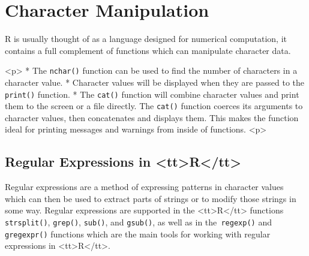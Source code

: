 
\section{Character Manipulation}
R is usually thought of as a language designed for numerical computation,
it contains a full complement of functions which can manipulate character
data.

<p>
*  The \texttt{nchar()} function can be used to find the number of characters in a character value.
*  Character values will be displayed when they are passed to the  \texttt{print()} function.
*  The \texttt{cat()}  function will combine
character values and print them to the screen or a file directly. The \texttt{cat()}
function coerces its arguments to character values, then concatenates and displays
them. This makes the function ideal for printing messages and warnings
from inside of functions.
<p>

\subsection{Regular Expressions in <tt>R</tt>}
Regular expressions are a method of expressing patterns in character values
which can then be used to extract parts of strings or to modify those strings in some way. Regular expressions are supported in the <tt>R</tt> functions \texttt{strsplit()},
\texttt{grep()}, \texttt{sub()}, and \texttt{gsub()}, as well as in the\texttt{ regexp()} and \texttt{gregexpr()} functions which
are the main tools for working with regular expressions in <tt>R</tt>.


\newpage
